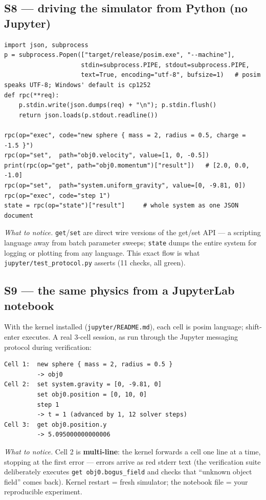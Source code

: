 \documentclass[11pt]{article}
\newcommand{\code}[1]{\texttt{#1}}
\begin{document}
\subsection{S8 --- driving the simulator from Python (no Jupyter)}

\begin{lstlisting}
import json, subprocess
p = subprocess.Popen(["target/release/posim.exe", "--machine"],
                     stdin=subprocess.PIPE, stdout=subprocess.PIPE,
                     text=True, encoding="utf-8", bufsize=1)   # posim speaks UTF-8; Windows' default is cp1252
def rpc(**req):
    p.stdin.write(json.dumps(req) + "\n"); p.stdin.flush()
    return json.loads(p.stdout.readline())

rpc(op="exec", code="new sphere { mass = 2, radius = 0.5, charge = -1.5 }")
rpc(op="set",  path="obj0.velocity", value=[1, 0, -0.5])
print(rpc(op="get", path="obj0.momentum")["result"])   # [2.0, 0.0, -1.0]
rpc(op="set",  path="system.uniform_gravity", value=[0, -9.81, 0])
rpc(op="exec", code="step 1")
state = rpc(op="state")["result"]     # whole system as one JSON document
\end{lstlisting}

\emph{What to notice.} \code{get}/\code{set} are direct wire versions
of the get/set API --- a scripting language away from batch parameter
sweeps; \code{state} dumps the entire system for logging or plotting
from any language. This exact flow is what
\code{jupyter/test\_protocol.py} asserts (11 checks, all green).

\subsection{S9 --- the same physics from a JupyterLab notebook}

With the kernel installed (\code{jupyter/README.md}), each cell is
posim language; shift-enter executes. A real 3-cell session, as run
through the Jupyter messaging protocol during verification:

\begin{lstlisting}
Cell 1:  new sphere { mass = 2, radius = 0.5 }
         -> obj0
Cell 2:  set system.gravity = [0, -9.81, 0]
         set obj0.position = [0, 10, 0]
         step 1
         -> t = 1 (advanced by 1, 12 solver steps)
Cell 3:  get obj0.position.y
         -> 5.095000000000006
\end{lstlisting}

\emph{What to notice.} Cell 2 is \textbf{multi-line}: the kernel
forwards a cell one line at a time, stopping at the first error ---
errors arrive as red stderr text (the verification suite deliberately
executes \code{get obj0.bogus\_field} and checks that ``unknown object
field'' comes back). Kernel restart = fresh simulator; the notebook
file = your reproducible experiment.
\end{document}
